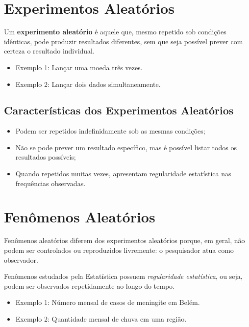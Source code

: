 \newpage
\section{Experimentos Aleatórios}

Um \textbf{experimento aleatório} é aquele que, mesmo repetido sob condições
idênticas, pode produzir resultados diferentes, sem que seja possível prever com
certeza o resultado individual.
\vskip0.3cm

\begin{itemize}
\item Exemplo 1: Lançar uma moeda três vezes. \\
\item Exemplo 2: Lançar dois dados simultaneamente.
\end{itemize}

\vskip0.3cm

\subsection{Características dos Experimentos Aleatórios}

\begin{itemize}
    \item Podem ser repetidos indefinidamente sob as mesmas condições;
    \item Não se pode prever um resultado específico, mas é possível listar todos
    os resultados possíveis;
    \item Quando repetidos muitas vezes, apresentam regularidade estatística nas frequências observadas.
\end{itemize}



\section{Fenômenos Aleatórios}

Fenômenos aleatórios diferem dos experimentos aleatórios porque, em geral,
não podem ser controlados ou reproduzidos livremente: o pesquisador atua como
observador. \vskip0.3cm

Fenômenos estudados pela Estatística possuem \textit{regularidade estatística},
ou seja, podem ser observados repetidamente ao longo do tempo. \vskip0.3cm


\begin{itemize}
\item Exemplo 1: Número mensal de casos de meningite em Belém. \\
\item Exemplo 2: Quantidade mensal de chuva em uma região.
\end{itemize}

